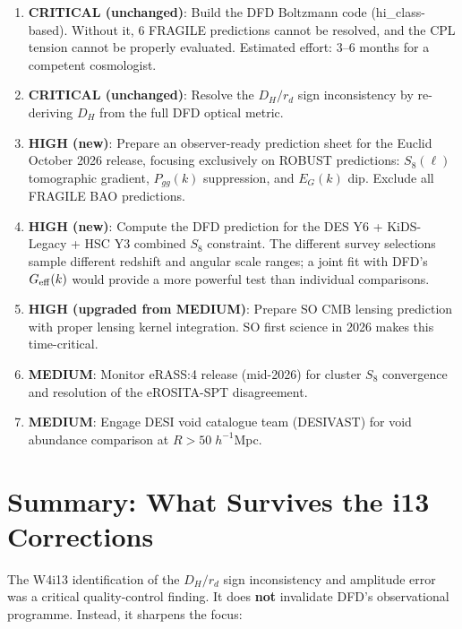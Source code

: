 \documentclass[11pt,a4paper]{article}
\newcommand{\Geff}{G_{\rm eff}}
\begin{document}
\begin{enumerate}

\item \textbf{CRITICAL (unchanged)}: Build the DFD Boltzmann code
  (hi\_class-based). Without it, 6 FRAGILE predictions cannot be
  resolved, and the CPL tension cannot be properly evaluated.
  Estimated effort: 3--6 months for a competent cosmologist.

\item \textbf{CRITICAL (unchanged)}: Resolve the $D_H/r_d$ sign
  inconsistency by re-deriving $D_H$ from the full DFD optical metric.

\item \textbf{HIGH (new)}: Prepare an observer-ready prediction sheet
  for the Euclid October 2026 release, focusing exclusively on ROBUST
  predictions: $S_8(\ell)$ tomographic gradient, $P_{gg}(k)$ suppression,
  and $E_G(k)$ dip. Exclude all FRAGILE BAO predictions.

\item \textbf{HIGH (new)}: Compute the DFD prediction for the DES
  Y6 + KiDS-Legacy + HSC Y3 combined $S_8$ constraint. The
  different survey selections sample different redshift and angular
  scale ranges; a joint fit with DFD's $\Geff(k)$ would provide a
  more powerful test than individual comparisons.

\item \textbf{HIGH (upgraded from MEDIUM)}: Prepare SO CMB lensing
  prediction with proper lensing kernel integration. SO first science
  in 2026 makes this time-critical.

\item \textbf{MEDIUM}: Monitor eRASS:4 release (mid-2026) for cluster
  $S_8$ convergence and resolution of the eROSITA-SPT disagreement.

\item \textbf{MEDIUM}: Engage DESI void catalogue team (DESIVAST) for
  void abundance comparison at $R > 50\;h^{-1}$Mpc.

\end{enumerate}


\section{Summary: What Survives the i13 Corrections}
\label{sec:summary}

The W4i13 identification of the $D_H/r_d$ sign inconsistency and
amplitude error was a critical quality-control finding. It does
\textbf{not} invalidate DFD's observational programme. Instead, it
sharpens the focus:
\end{document}
